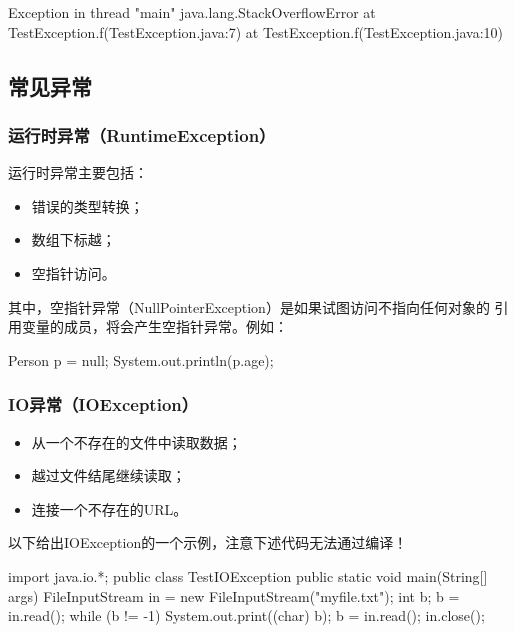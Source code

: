 \begin{stdoutCode}
  Exception in thread "main" java.lang.StackOverflowError
  at TestException.f(TestException.java:7)
  at TestException.f(TestException.java:10)  
\end{stdoutCode}

\subsection{常见异常}

\subsubsection{运行时异常（RuntimeException）}

运行时异常主要包括：

\begin{itemize}
\item 错误的类型转换；
\item 数组下标越；
\item 空指针访问。
\end{itemize}

其中，空指针异常（NullPointerException）是如果试图访问不指向任何对象的
引用变量的成员，将会产生空指针异常。例如：

\begin{javaCode}
Person p = null;
System.out.println(p.age);  
\end{javaCode}

\subsubsection{IO异常（IOException）}

\begin{itemize}
\item 从一个不存在的文件中读取数据；
\item 越过文件结尾继续读取；
\item 连接一个不存在的URL。
\end{itemize}

以下给出IOException的一个示例，注意下述代码无法通过编译！


\begin{javaCode}
import java.io.*;
public class TestIOException {
  public static void main(String[] args) {
    FileInputStream in = new FileInputStream("myfile.txt");
    int b;
    b = in.read();
    while (b != -1) {
      System.out.print((char) b);
      b = in.read();
    }
    in.close();
  }
}  
\end{javaCode}


